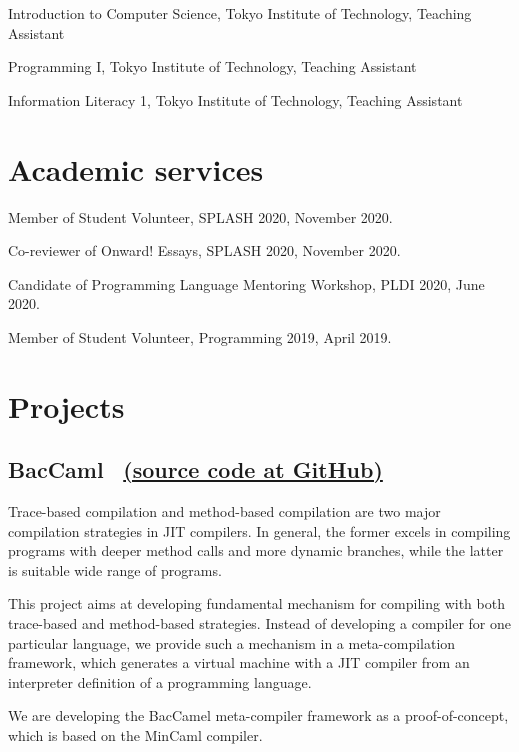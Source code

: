 \documentclass[11pt]{article} %
\newcommand{\伊澤侑祐}{\underline{伊澤侑祐}}
\newcommand{\jit}{\textsc{JIT} }
\begin{document}
 Introduction to Computer Science, Tokyo Institute of Technology, Teaching Assistant

 Programming I, Tokyo Institute of Technology, Teaching Assistant

 Information Literacy 1, Tokyo Institute of Technology, Teaching Assistant


\section*{Academic services}

 Member of Student Volunteer, SPLASH 2020, November 2020.

 Co-reviewer of Onward! Essays, SPLASH 2020, November 2020.

 Candidate of Programming Language Mentoring Workshop, PLDI 2020, June 2020.

 Member of Student Volunteer, Programming 2019, April 2019.

\section*{Projects}

\subsection*{BacCaml \, \href{https://github.com/prg-titech/baccaml}{(source code at GitHub)}}

\medskip

Trace-based compilation and method-based compilation are two major compilation
strategies in \jit compilers. In general, the former excels in  compiling
programs with deeper method calls and more dynamic branches, while  the latter
is suitable wide range of programs.

\medskip

This project aims at developing fundamental mechanism for compiling with both
trace-based and method-based strategies. Instead of developing  a compiler for
one particular language, we provide such a mechanism in a meta-compilation
framework, which generates a virtual machine with a \jit compiler from an
interpreter definition of a programming language.

\medskip

We are developing the BacCamel meta-compiler framework as a proof-of-concept,
which is based on the MinCaml compiler.
\end{document}
